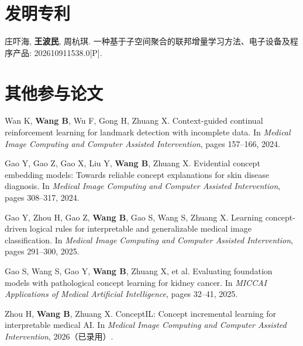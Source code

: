 \section*{发明专利}

\begin{enumerate}[
  leftmargin=2.3em,
  label={[\arabic*]},
  itemsep=0.55em,
  topsep=0.4em
]
  \item 庄吓海, \textbf{王波民}, 周杭琪.
  一种基于子空间聚合的联邦增量学习方法、电子设备及程序产品:
  202610911538.0[P].
\end{enumerate}


\section*{其他参与论文}


\begin{enumerate}[leftmargin=2.3em,label={[\arabic*]},itemsep=0.55em,topsep=0.4em]
  \item Wan K, \textbf{Wang B}, Wu F, Gong H, Zhuang X. Context-guided continual reinforcement learning for landmark detection with incomplete data. In \emph{Medical Image Computing and Computer Assisted Intervention}, pages 157--166, 2024.

  \item Gao Y, Gao Z, Gao X, Liu Y, \textbf{Wang B}, Zhuang X. Evidential concept embedding models: Towards reliable concept explanations for skin disease diagnosis. In \emph{Medical Image Computing and Computer Assisted Intervention}, pages 308--317, 2024.

  \item Gao Y, Zhou H, Gao Z, \textbf{Wang B}, Gao S, Wang S, Zhuang X. Learning concept-driven logical rules for interpretable and generalizable medical image classification. In \emph{Medical Image Computing and Computer Assisted Intervention}, pages 291--300, 2025.

  \item Gao S, Wang S, Gao Y, \textbf{Wang B}, Zhuang X, et al. Evaluating foundation models with pathological concept learning for kidney cancer. In \emph{MICCAI Applications of Medical Artificial Intelligence}, pages 32--41, 2025.

  \item Zhou H, \textbf{Wang B}, Zhuang X. ConceptIL: Concept incremental learning for interpretable medical AI. In \emph{Medical Image Computing and Computer Assisted Intervention}, 2026（已录用）.

\end{enumerate}

